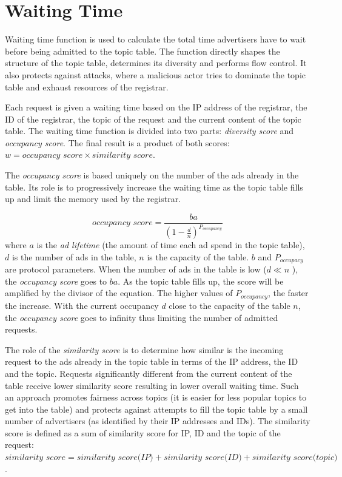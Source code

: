 
\section{Waiting Time}
\label{sec:waitingTime}
Waiting time function is used to calculate the total time advertisers have to wait before being admitted to the topic table. The function directly shapes the structure of the topic table, determines its diversity and performs flow control. It also protects against attacks, where a malicious actor tries to dominate the topic table and exhaust resources of the registrar. 

Each request is given a waiting time based on the IP address of the registrar, the ID of the registrar, the topic of the request and the current content of the topic table. The waiting time function is divided into two parts: \emph{diversity score} and \emph{occupancy score}. The final result is a product of both scores: $w =  \textit{occupancy score} \times \textit{similarity score} $. 

The \emph{occupancy score} is based uniquely on the number of the ads already in the table. Its role is to progressively increase the waiting time as the topic table fills up and limit the memory used by the registrar.

\begin{equation}
    \textit{occupancy score} = \frac{ba}{(1-\frac{d}{n})^{P_{occupancy}}}
\end{equation}
where $a$ is the \emph{ad lifetime} (the amount of time each ad spend in the topic table), $d$ is the number of ads in the table, $n$ is the capacity of the table. $b$ and $P_{occupacy}$ are protocol parameters. When the number of ads in the table is low ($d \ll n$ ), the \emph{occupancy score} goes to $ba$. As the topic table fills up, the score will be amplified by the divisor of the equation. The higher values of $P_{occupancy}$, the faster the increase. With the current occupancy $d$ close to the capacity of the table $n$, the \emph{occupancy score} goes to infinity thus limiting the number of admitted requests. 

The role of the \emph{similarity score} is to determine how similar is the incoming request to the ads already in the topic table in terms of the IP address, the ID and the topic. Requests significantly different from the current content of the table receive lower similarity score resulting in lower overall waiting time. Such an approach promotes fairness across topics (it is easier for less popular topics to get into the table) and protects against attempts to fill the topic table by a small number of advertisers (as identified by their IP addresses and IDs). The similarity score is defined as a sum of similarity score for IP, ID and the topic of the request: $\textit{similarity score} = \textit{similarity score(IP)} + \textit{similarity score(ID)} + \textit{similarity score(topic)}$. 

